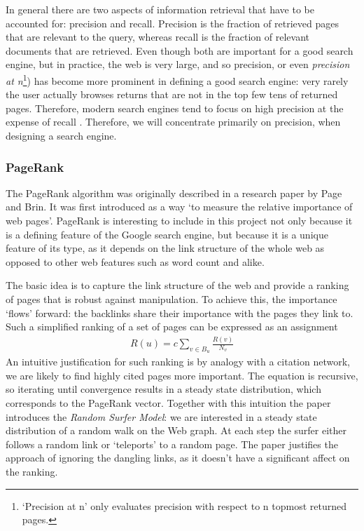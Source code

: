 \documentclass[12pt,notitlepage,twoside]{scrreprt}
\begin{document}
In general there are two aspects of information retrieval that have to be
accounted for: precision and recall. Precision is the fraction of retrieved pages that
are relevant to the query, whereas recall is the fraction of relevant
documents that are retrieved. Even though both are important for a good search
engine, but in practice, the web is very large, and so precision, or even
\textit{precision at n}\footnote{`Precision at n' only evaluates precision with respect to
n topmost returned pages.}) has become
more prominent in defining a good search engine: very rarely the user actually
browses returns that are not in the top few tens of returned pages. Therefore, 
modern search engines tend to focus on high precision at the expense of recall
\cite{GOOGLE}. Therefore, we will concentrate primarily on precision, when
designing a search engine.

\subsubsection*{PageRank}
The PageRank algorithm was originally described in a research paper
by Page and Brin\cite{PageRank}. It was first introduced as a way `to measure
the relative importance of web pages'. PageRank is interesting to include in
this project not only because it is a defining feature of the Google search
engine, but because it is a unique feature of its type, as it depends on the link
structure of the whole web as opposed to other  web features such as word count
and alike.

The basic idea is to capture the link structure of the web and provide a
ranking of pages that is robust against manipulation. To achieve this, the
importance `flows' forward: the backlinks share their importance with the pages
they link to. Such a simplified ranking of a set of pages can be expressed as an assignment
\begin{gather}
  R(u)=c\sum_{v\in B_u}\frac{R(v)}{N_v}
\end{gather}
An intuitive justification for such ranking is by analogy with a citation
network, we are likely to find highly cited pages more important.
The equation is recursive, so iterating until convergence results in a steady
state distribution, which corresponds to the PageRank vector.
Together with this intuition the paper introduces the \textit{Random Surfer
Model}: we are interested in a steady state distribution of a random walk on
the Web graph. At each step the surfer either follows a random link or
`teleports' to a random page. The paper justifies the approach of ignoring the
dangling links, as it doesn't have a significant affect on the ranking. 
\end{document}
